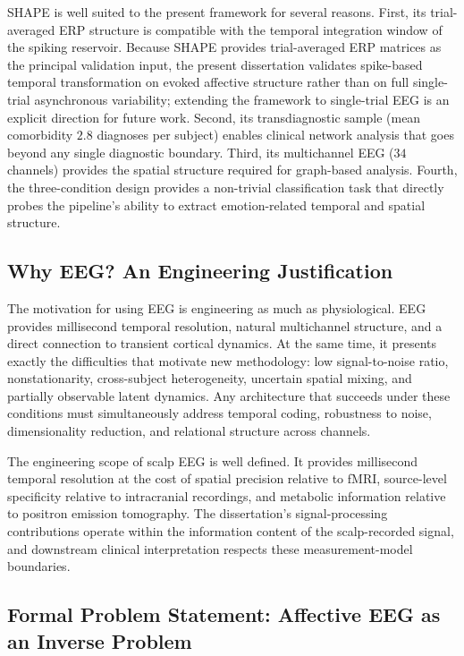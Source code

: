 SHAPE is well suited to the present framework for several reasons. First, its trial-averaged ERP structure is compatible with the temporal integration window of the spiking reservoir. Because SHAPE provides trial-averaged ERP matrices as the principal validation input, the present dissertation validates spike-based temporal transformation on evoked affective structure rather than on full single-trial asynchronous variability; extending the framework to single-trial EEG is an explicit direction for future work. Second, its transdiagnostic sample (mean comorbidity $2.8$ diagnoses per subject) enables clinical network analysis that goes beyond any single diagnostic boundary. Third, its multichannel EEG ($34$ channels) provides the spatial structure required for graph-based analysis. Fourth, the three-condition design provides a non-trivial classification task that directly probes the pipeline's ability to extract emotion-related temporal and spatial structure.

\subsection{Why EEG? An Engineering Justification}

The motivation for using EEG is engineering as much as physiological. EEG provides millisecond temporal resolution, natural multichannel structure, and a direct connection to transient cortical dynamics. At the same time, it presents exactly the difficulties that motivate new methodology: low signal-to-noise ratio, nonstationarity, cross-subject heterogeneity, uncertain spatial mixing, and partially observable latent dynamics. Any architecture that succeeds under these conditions must simultaneously address temporal coding, robustness to noise, dimensionality reduction, and relational structure across channels.

The engineering scope of scalp EEG is well defined. It provides millisecond temporal resolution at the cost of spatial precision relative to fMRI, source-level specificity relative to intracranial recordings, and metabolic information relative to positron emission tomography. The dissertation's signal-processing contributions operate within the information content of the scalp-recorded signal, and downstream clinical interpretation respects these measurement-model boundaries.

\subsection{Formal Problem Statement: Affective EEG as an Inverse Problem}
\label{sec:inverse_problem}

